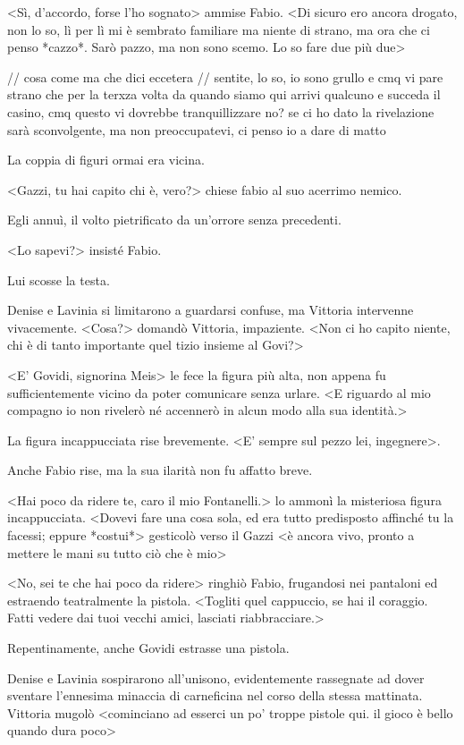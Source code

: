 <Sì, d'accordo, forse l'ho sognato> ammise Fabio. <Di sicuro ero ancora drogato, non lo so, lì per lì  mi è sembrato familiare ma niente di strano, ma ora che ci penso *cazzo*. Sarò pazzo, ma non sono scemo. Lo so fare due più due>

// cosa come ma che dici eccetera
// sentite, lo so, io sono grullo e cmq vi pare strano che per la terxza volta da quando siamo qui arrivi qualcuno e succeda il casino, cmq questo vi dovrebbe tranquillizzare no? se ci ho dato la rivelazione sarà sconvolgente, ma non preoccupatevi, ci penso io a dare di matto

La coppia di figuri ormai era vicina.

<Gazzi, tu hai capito chi è, vero?> chiese fabio al suo acerrimo nemico. 

Egli annuì, il volto pietrificato da un'orrore senza precedenti.

<Lo sapevi?> insisté Fabio.

Lui scosse la testa. 

Denise e Lavinia si limitarono a guardarsi confuse, ma Vittoria intervenne vivacemente. <Cosa?> domandò Vittoria, impaziente. <Non ci ho capito niente, chi è di tanto importante quel tizio insieme al Govi?>

<E' Govidi, signorina Meis> le fece la figura più alta, non appena fu sufficientemente vicino da poter comunicare senza urlare. <E riguardo al mio compagno io non rivelerò né accennerò in alcun modo alla sua identità.>

La figura incappucciata rise brevemente. <E' sempre sul pezzo lei, ingegnere>.

Anche Fabio rise, ma la sua ilarità non fu affatto breve.

<Hai poco da ridere te, caro il mio Fontanelli.> lo ammonì la misteriosa figura incappucciata. <Dovevi fare una cosa sola, ed era tutto predisposto affinché tu la facessi; eppure *costui*> gesticolò verso il Gazzi <è ancora vivo, pronto a mettere le mani su tutto ciò che è mio>

<No, sei te che hai poco da ridere> ringhiò Fabio, frugandosi nei pantaloni ed estraendo teatralmente la pistola. <Togliti quel cappuccio, se hai il coraggio. Fatti vedere dai tuoi vecchi amici, lasciati riabbracciare.>

Repentinamente, anche Govidi estrasse una pistola.

Denise e Lavinia sospirarono all'unisono, evidentemente rassegnate ad dover sventare l'ennesima minaccia di carneficina nel corso della stessa mattinata. Vittoria mugolò <cominciano ad esserci un po' troppe pistole qui. il gioco è bello quando dura poco>

